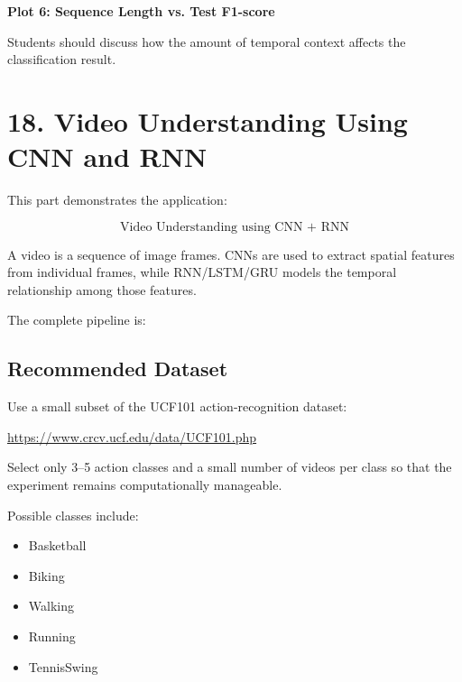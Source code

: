 \documentclass[10pt]{article}
\begin{document}
\textbf{Plot 6: Sequence Length vs. Test F1-score}

Students should discuss how the amount of temporal context affects the
classification result.

\section*{18. Video Understanding Using CNN and RNN}

This part demonstrates the application:

\[
\boxed{\text{Video Understanding using CNN + RNN}}
\]

A video is a sequence of image frames. CNNs are used to extract spatial
features from individual frames, while RNN/LSTM/GRU models the temporal
relationship among those features.

The complete pipeline is:

\begin{center}
\end{center}

\subsection*{Recommended Dataset}

Use a small subset of the UCF101 action-recognition dataset:

\url{https://www.crcv.ucf.edu/data/UCF101.php}

Select only 3--5 action classes and a small number of videos per class so that
the experiment remains computationally manageable.

Possible classes include:

\begin{itemize}
\item Basketball
\item Biking
\item Walking
\item Running
\item TennisSwing
\end{itemize}
\end{document}
